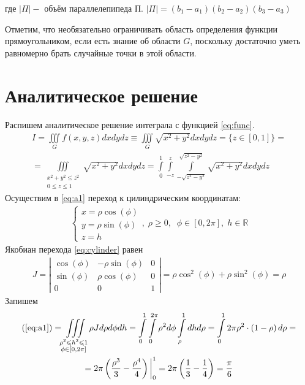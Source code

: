 \documentclass[12pt, fleqn]{article}
\theoremstyle{definition}
\begin{document}
где $|\Pi|-$ объём параллелепипеда П. $|\Pi|=\left(b_{1}-a_{1}\right)\left(b_{2}-a_{2}\right)\left(b_{3}-a_{3}\right)$

Отметим, что необязательно ограничивать область определения функции прямоугольником, если есть знание об области $G$, поскольку достаточно уметь равномерно брать случайные точки в этой области.
\section{Аналитическое решение}\label{sec:analytic}
Распишем аналитическое решение интеграла с функцией \ref{eq:func}.
\begin{gather}
 I = \iiint\limits_{G} f(x, y, z) d x d y d z \equiv \iiint\limits_{G} \sqrt{x^2 + y^2} d x d y d z = \{z\in[0,1]\} = \nonumber \\
 = \iiint\limits_{\substack{x^2+y^2\leqslant z^2 \\ 0\leqslant z\leqslant 1}} \sqrt{x^2 + y^2} d x d y dz  = \int\limits_0^1\int\limits_{-z}^z\int\limits_{-\sqrt{z^2 - y^2}}^{\sqrt{z^2 - y^2}} \sqrt{x^2 + y^2} d x d y dz \label{eq:a1}
\end{gather}
Осуществим в \ref{eq:a1} переход к цилиндрическим координатам:
\begin{gather}
 \begin{cases}
  x = \rho \cos(\phi) \\
  y = \rho \sin(\phi) \\
  z = h
 \end{cases}, \; \rho \geqslant 0,  \;\; \phi \in [0, 2\pi], \; h\in \mathbb{R}
 \label{eq:cylinder}
\end{gather}
Якобиан перехода \ref{eq:cylinder} равен
\begin{gather}
 J = \left|
 \begin{array}{ccc}
 \cos(\phi) & -\rho \sin(\phi)&0\\
 \sin(\phi) & \rho \cos(\phi) &0\\
 0 & 0 & 1
 \end{array}
 \right| = \rho\cos^2(\phi) + \rho \sin^2(\phi) = \rho
\end{gather}
Запишем
\begin{gather}
 (\ref{eq:a1}) = \iiint\limits_{\substack{\rho^2\leqslant h^2 \leqslant 1 \\ \phi\in[0, 2\pi]} } \rho J d \rho d \phi d h=
 \int\limits_0^1\int\limits_0^{2\pi} \rho^2 d \phi \int\limits_{\rho}^1d h d \rho= 
 \int\limits_0^1 2\pi\rho^2 \cdot \left(1 - \rho\right)d \rho = \nonumber\\
 = 2\pi \left(\frac{\rho^3}{3} - \frac{\rho^4}{4}\right)\bigg|_0^1 = 2\pi \left(\frac{1}{3} - \frac{1}{4}\right) = \frac{\pi}{6} \label{eq:aans}
\end{gather}
\end{document}
